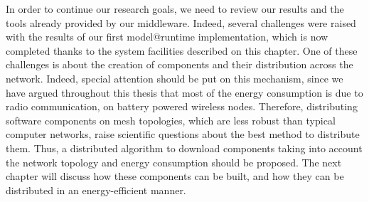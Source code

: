 In order to continue our research goals, we need to review our results and the tools already provided by our middleware.
Indeed, several challenges were raised with the results of our first model@runtime implementation, which is now completed thanks to the system facilities described on this chapter.
One of these challenges is about the creation of components and their distribution across the network.
Indeed, special attention should be put on this mechanism, since we have argued throughout this thesis that most of the energy consumption is due to radio communication, on battery powered wireless nodes.
Therefore, distributing software components on mesh topologies, which are less robust than typical computer networks, raise scientific questions about the best method to distribute them.
Thus, a distributed algorithm to download components taking into account the network topology and energy consumption should be proposed.
The next chapter will discuss how these components can be built, and how they can be distributed in an energy-efficient manner.
